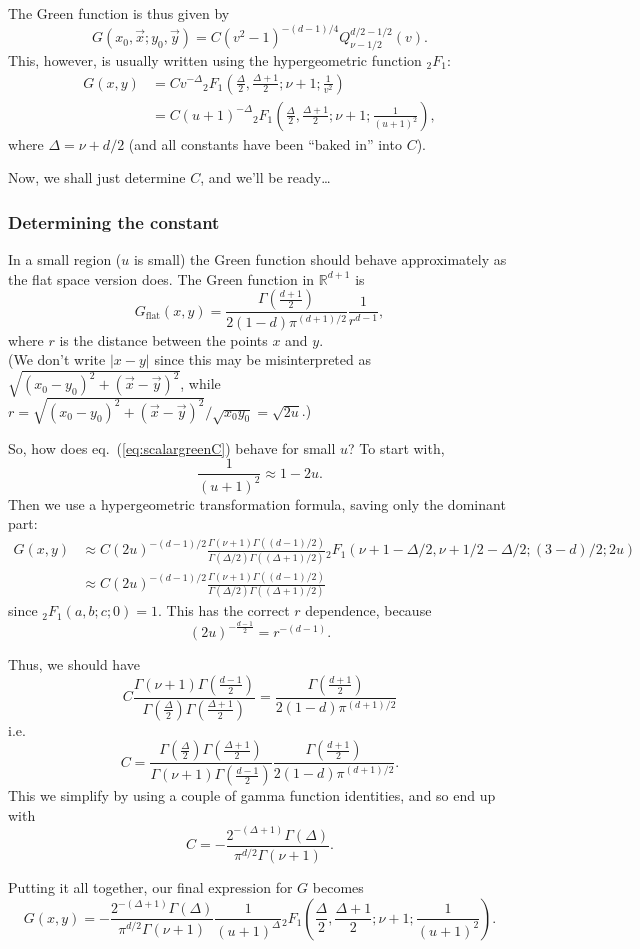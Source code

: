 The Green function is thus given by
$$G(x_0,\vec x; y_0, \vec y) = C (v^2-1)^{-(d-1)/4} Q_{\nu-1/2}^{d/2-1/2}(v).$$
This, however, is usually written using the hypergeometric function ${}_2F_1$:
\begin{equation*}\label{eq:scalargreenC}
\begin{split}
G(x,y)&=C v^{-\Delta} {}_2F_1\left(\frac{\Delta}{2}, \frac{\Delta+1}{2}; \nu+1; \frac{1}{v^2}\right)\\
&=C (u+1)^{-\Delta} {}_2F_1\left(\frac{\Delta}{2}, \frac{\Delta+1}{2}; \nu+1; \frac{1}{(u+1)^2}\right),
\end{split}
\end{equation*}
where $\Delta=\nu+d/2$ (and all constants have been ``baked in'' into $C$).

Now, we shall just determine $C$, and we'll be ready\dots

\subsubsection{Determining the constant}
In a small region ($u$ is small) the Green function should behave approximately as the flat space version does. The Green function in $\mathbb{R}^{d+1}$ is
$$G_{\mathrm{flat}}(x,y) = \frac{\Gamma(\frac{d+1}2)}{2(1-d)\pi^{(d+1)/2}} \frac{1}{r^{d-1}},$$
where $r$ is the distance between the points $x$ and $y$.\\
(We don't write $|x-y|$ since this may be misinterpreted as $\sqrt{(x_0-y_0)^2+(\vec x-\vec y)^2}$, while $r=\sqrt{(x_0-y_0)^2+(\vec x-\vec y)^2}/\sqrt{x_0 y_0}=\sqrt{2u}$.)

So, how does eq.~(\ref{eq:scalargreenC}) behave for small $u$? To start with,
$$\frac{1}{(u+1)^2} \approx 1-2u.$$
Then we use a hypergeometric transformation formula, saving only the dominant part:
\begin{equation*}
\begin{split}
G(x,y) &\approx C (2u)^{-(d-1)/2} \frac{\Gamma(\nu+1)\Gamma((d-1)/2)}{\Gamma(\Delta/2)\Gamma((\Delta+1)/2)} {}_2F_1(\nu+1-\Delta/2, \nu+1/2-\Delta/2; (3-d)/2; 2u) \\
&\approx C (2u)^{-(d-1)/2} \frac{\Gamma(\nu+1)\Gamma((d-1)/2)}{\Gamma(\Delta/2)\Gamma((\Delta+1)/2)}
\end{split}
\end{equation*}
since ${}_2F_1(a,b;c;0)=1$.
This has the correct $r$ dependence, because
$$(2u)^{-\frac{d-1}{2}}=r^{-(d-1)}.$$

Thus, we should have
$$C \frac{\Gamma(\nu+1)\Gamma(\frac{d-1}{2})}{\Gamma(\frac \Delta 2)\Gamma(\frac{\Delta+1}{2})} = \frac{\Gamma(\frac{d+1}2)}{2(1-d)\pi^{(d+1)/2}}$$
i.e.
$$C = \frac{\Gamma(\frac \Delta 2)\Gamma(\frac{\Delta+1}{2})}{\Gamma(\nu+1)\Gamma(\frac{d-1}{2})} \frac{\Gamma(\frac{d+1}2)}{2(1-d)\pi^{(d+1)/2}}.$$
This we simplify by using a couple of gamma function identities, and so end up with
$$C = - \frac{2^{-(\Delta+1)} \Gamma(\Delta)}{\pi^{d/2} \Gamma(\nu+1)}.$$

Putting it all together, our final expression for $G$ becomes
\begin{equation}\label{eq:scalargreen}
G(x,y) = - \frac{2^{-(\Delta+1)} \Gamma(\Delta)}{\pi^{d/2} \Gamma(\nu+1)}
\frac{1}{(u+1)^\Delta} {}_2F_1\left(\frac{\Delta}{2}, \frac{\Delta+1}{2}; \nu+1; \frac{1}{(u+1)^2}\right).
\end{equation}
